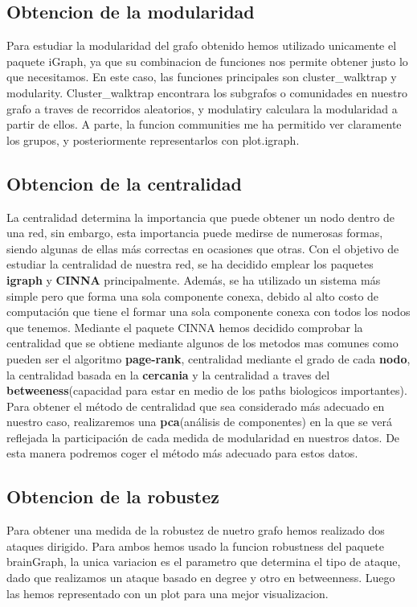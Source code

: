\subsection{Obtencion de la modularidad}
Para estudiar la modularidad del grafo obtenido hemos utilizado unicamente el paquete iGraph, ya que su combinacion de funciones nos permite obtener justo lo que necesitamos.
En este caso, las funciones principales son cluster\_walktrap y modularity. Cluster\_walktrap encontrara los subgrafos o comunidades en nuestro grafo a traves de recorridos aleatorios, y modulatiry calculara la modularidad a partir de ellos. 
A parte, la funcion communities me ha permitido ver claramente los grupos, y posteriormente representarlos con plot.igraph.

\subsection{Obtencion de la centralidad}
La centralidad determina la importancia que puede obtener un nodo dentro de una red, sin embargo, esta importancia puede medirse de numerosas formas, siendo algunas de ellas m\'as correctas en ocasiones que otras.
Con el objetivo de estudiar la centralidad de nuestra red, se ha decidido emplear los paquetes \textbf{igraph} y \textbf{CINNA} principalmente. Adem\'as, se ha utilizado un sistema m\'as simple pero que forma una sola componente conexa, debido al alto costo de computaci\'on que tiene el formar una sola componente conexa con todos los nodos que tenemos.
Mediante el paquete CINNA hemos decidido comprobar la centralidad que se obtiene mediante algunos de los metodos mas comunes como pueden ser el algoritmo \textbf{page-rank}, centralidad mediante el grado de cada \textbf{nodo}, la centralidad basada en la \textbf{cercania} y la centralidad a traves del \textbf{betweeness}(capacidad para estar en medio de los paths biologicos importantes).
Para obtener el m\'etodo de centralidad que sea considerado m\'as adecuado en nuestro caso, realizaremos una \textbf{pca}(an\'alisis de componentes) en la que se ver\'a reflejada la participaci\'on de cada medida de modularidad en nuestros datos. De esta manera podremos coger el método más adecuado para estos datos.

\subsection{Obtencion de la robustez}
Para obtener una medida de la robustez de nuetro grafo hemos realizado dos ataques dirigido. Para ambos hemos usado la funcion robustness del paquete brainGraph, la unica variacion es el parametro que determina el tipo de ataque, dado que realizamos un ataque basado en degree y otro en betweenness. Luego las hemos representado con un plot para una mejor visualizacion.

